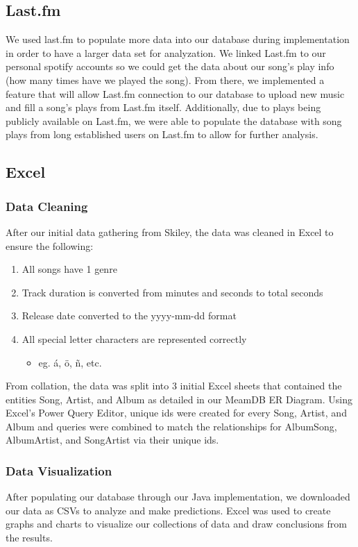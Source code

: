 \documentclass[12pt]{article}
\begin{document}
    \subsection{Last.fm}
    We used last.fm to populate more data into our database during implementation
    in order to have a larger data set for analyzation. We linked Last.fm to our
    personal spotify accounts so we could get the data about our song's play info
    (how many times have we played the song). From there, we implemented a feature
    that will allow Last.fm connection to our database to upload new music and fill
    a song's plays from Last.fm itself. Additionally, due to plays being publicly
    available on Last.fm, we were able to populate the database with song plays from
    long established users on Last.fm to allow for further analysis.

    \subsection{Excel}
    \subsubsection{Data Cleaning}
    After our initial data gathering from Skiley, the data was cleaned in Excel to ensure
    the following:
    \begin{enumerate}
        \item All songs have 1 genre
        \item Track duration is converted from minutes and seconds to total seconds
        \item Release date converted to the yyyy-mm-dd format
        \item All special letter characters are represented correctly
            \begin{itemize}
                \item eg. \'{a}, \"{o}, \~{n}, etc.
            \end{itemize}
    \end{enumerate}
    From collation, the data was split into 3 initial Excel sheets that contained the entities Song,
    Artist, and Album as detailed in our MeamDB ER Diagram. Using Excel's Power Query Editor, unique
    ids were created for every Song, Artist, and Album and queries were combined to match the relationships
    for AlbumSong, AlbumArtist, and SongArtist via their unique ids.

    \subsubsection{Data Visualization}
    After populating our database through our Java implementation, we downloaded our data as CSVs to
    analyze and make predictions. Excel was used to create graphs and charts to visualize our
    collections of data and draw conclusions from the results.
\end{document}
